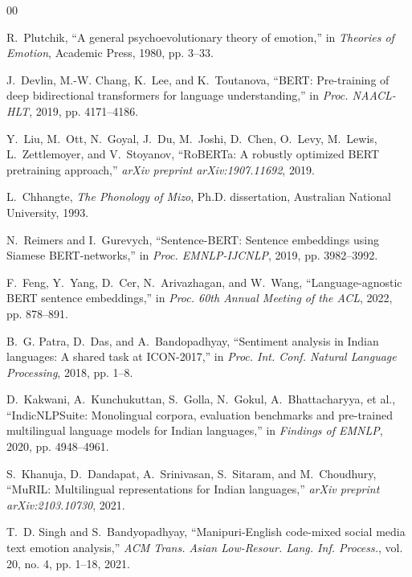 \documentclass[conference]{IEEEtran}
\begin{document}

\begin{thebibliography}{00}

R.~Plutchik, ``A general psychoevolutionary theory of emotion,'' in \emph{Theories of Emotion}, Academic Press, 1980, pp. 3--33.

J.~Devlin, M.-W. Chang, K.~Lee, and K.~Toutanova, ``BERT: Pre-training of deep bidirectional transformers for language understanding,'' in \emph{Proc. NAACL-HLT}, 2019, pp. 4171--4186.

Y.~Liu, M.~Ott, N.~Goyal, J.~Du, M.~Joshi, D.~Chen, O.~Levy, M.~Lewis, L.~Zettlemoyer, and V.~Stoyanov, ``RoBERTa: A robustly optimized BERT pretraining approach,'' \emph{arXiv preprint arXiv:1907.11692}, 2019.

L.~Chhangte, \emph{The Phonology of Mizo}, Ph.D. dissertation, Australian National University, 1993.

N.~Reimers and I.~Gurevych, ``Sentence-BERT: Sentence embeddings using Siamese BERT-networks,'' in \emph{Proc. EMNLP-IJCNLP}, 2019, pp. 3982--3992.

F.~Feng, Y.~Yang, D.~Cer, N.~Arivazhagan, and W.~Wang, ``Language-agnostic BERT sentence embeddings,'' in \emph{Proc. 60th Annual Meeting of the ACL}, 2022, pp. 878--891.

B.~G. Patra, D.~Das, and A.~Bandopadhyay, ``Sentiment analysis in Indian languages: A shared task at ICON-2017,'' in \emph{Proc. Int. Conf. Natural Language Processing}, 2018, pp. 1--8.

D.~Kakwani, A.~Kunchukuttan, S.~Golla, N.~Gokul, A.~Bhattacharyya, et al., ``IndicNLPSuite: Monolingual corpora, evaluation benchmarks and pre-trained multilingual language models for Indian languages,'' in \emph{Findings of EMNLP}, 2020, pp. 4948--4961.

S.~Khanuja, D.~Dandapat, A.~Srinivasan, S.~Sitaram, and M.~Choudhury, ``MuRIL: Multilingual representations for Indian languages,'' \emph{arXiv preprint arXiv:2103.10730}, 2021.

T.~D. Singh and S.~Bandyopadhyay, ``Manipuri-English code-mixed social media text emotion analysis,'' \emph{ACM Trans. Asian Low-Resour. Lang. Inf. Process.}, vol. 20, no. 4, pp. 1--18, 2021.


\end{thebibliography}
\end{document}
